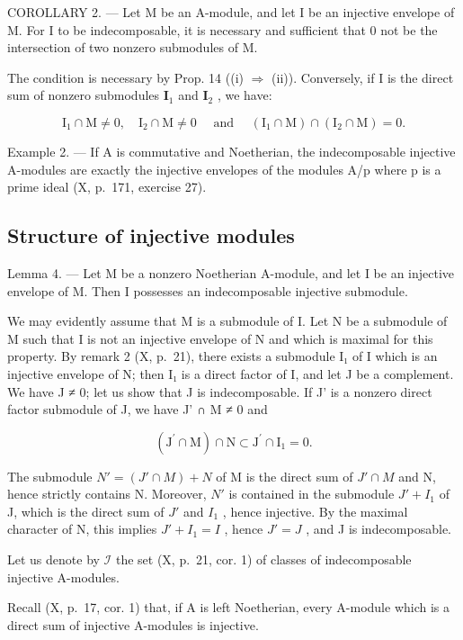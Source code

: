 COROLLARY 2. --- Let M be an A-module, and let I be an injective envelope of M. For I to be indecomposable, it is necessary and sufficient that 0 not be the intersection of two nonzero submodules of M.

The condition is necessary by Prop. 14 ((i) \(\Rightarrow\) (ii)). Conversely, if I is the direct sum of nonzero submodules \(\mathbf{I}_1\) and \(\mathbf{I}_2\) , we have:

\[
\mathrm{I} _ {1} \cap \mathrm{M} \neq 0, \quad \mathrm{I} _ {2} \cap \mathrm{M} \neq 0 \quad \text { and } \quad (\mathrm{I} _ {1} \cap \mathrm{M}) \cap (\mathrm{I} _ {2} \cap \mathrm{M}) = 0.
\]

Example 2. --- If A is commutative and Noetherian, the indecomposable injective A-modules are exactly the injective envelopes of the modules A/p where p is a prime ideal (X, p.~171, exercise 27).

\subsection{Structure of injective modules}

Lemma 4. --- Let M be a nonzero Noetherian A-module, and let I be an injective envelope of M. Then I possesses an indecomposable injective submodule.

We may evidently assume that M is a submodule of I. Let N be a submodule of M such that I is not an injective envelope of N and which is maximal for this property. By remark 2 (X, p.~21), there exists a submodule I₁ of I which is an injective envelope of N; then I₁ is a direct factor of I, and let J be a complement. We have J ≠ 0; let us show that J is indecomposable. If J' is a nonzero direct factor submodule of J, we have J' ∩ M ≠ 0 and

\[
\left(\mathrm{J} ^ {\prime} \cap \mathrm{M}\right) \cap \mathrm{N} \subset \mathrm{J} ^ {\prime} \cap \mathrm{I} _ {1} = 0.
\]

The submodule \(N' = (J' \cap M) + N\) of M is the direct sum of \(J' \cap M\) and N, hence strictly contains N. Moreover, \(N'\) is contained in the submodule \(J' + I_{1}\) of J, which is the direct sum of \(J'\) and \(I_{1}\) , hence injective. By the maximal character of N, this implies \(J' + I_{1} = I\) , hence \(J' = J\) , and J is indecomposable.

Let us denote by \(\mathcal{I}\) the set (X, p.~21, cor. 1) of classes of indecomposable injective A-modules.

Recall (X, p.~17, cor. 1) that, if A is left Noetherian, every A-module which is a direct sum of injective A-modules is injective.

